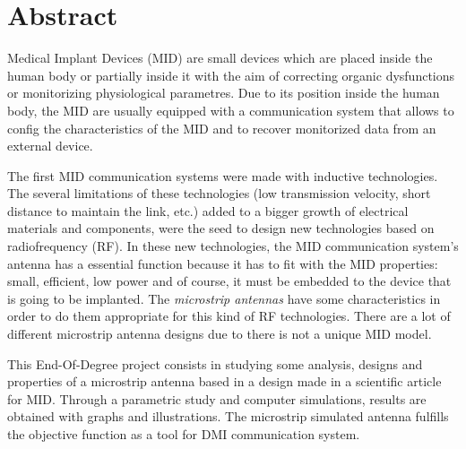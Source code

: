 \chapter*{\textbf{Abstract}}

Medical Implant Devices (MID) are small devices which are placed inside the human body or partially inside it with the aim of correcting organic dysfunctions or monitorizing physiological parametres. Due to its position inside the human body, the MID are usually equipped with a communication system that allows to config the characteristics of the MID and to recover monitorized data from an external device.

The first MID communication systems were made with inductive technologies. The several limitations of these technologies (low transmission velocity, short distance to maintain the link, etc.) added to a bigger growth of electrical materials and components, were the seed to design new technologies based on radiofrequency (RF). In these new technologies, the MID communication system's antenna has a essential function because it has to fit with the MID properties: small, efficient, low power and of course, it must be embedded to the device that is going to be implanted. The \textit{microstrip antennas} have some characteristics in order to do them appropriate for this kind of RF technologies. There are a lot of different microstrip antenna designs due to there is not a unique MID model.

This End-Of-Degree project consists in studying some analysis, designs and properties of a microstrip antenna based in a design made in a scientific article for MID. Through a parametric study and computer simulations, results are obtained with graphs and illustrations. The microstrip simulated antenna fulfills the objective function as a tool for DMI communication system.

